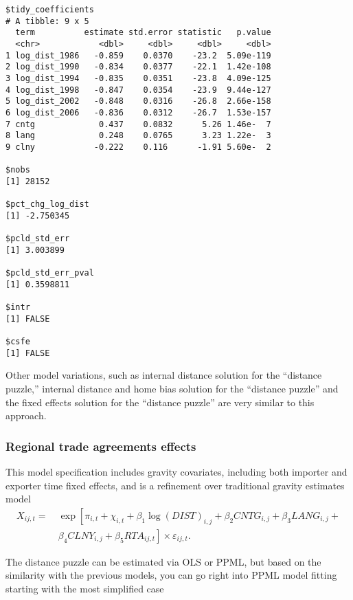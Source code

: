 \documentclass[12pt,reqno,oneside,pdftex]{formato-puc/puctesis} %
\begin{document}
\begin{verbatim}
$tidy_coefficients
# A tibble: 9 x 5
  term          estimate std.error statistic   p.value
  <chr>            <dbl>     <dbl>     <dbl>     <dbl>
1 log_dist_1986   -0.859    0.0370    -23.2  5.09e-119
2 log_dist_1990   -0.834    0.0377    -22.1  1.42e-108
3 log_dist_1994   -0.835    0.0351    -23.8  4.09e-125
4 log_dist_1998   -0.847    0.0354    -23.9  9.44e-127
5 log_dist_2002   -0.848    0.0316    -26.8  2.66e-158
6 log_dist_2006   -0.836    0.0312    -26.7  1.53e-157
7 cntg             0.437    0.0832      5.26 1.46e-  7
8 lang             0.248    0.0765      3.23 1.22e-  3
9 clny            -0.222    0.116      -1.91 5.60e-  2

$nobs
[1] 28152

$pct_chg_log_dist
[1] -2.750345

$pcld_std_err
[1] 3.003899

$pcld_std_err_pval
[1] 0.3598811

$intr
[1] FALSE

$csfe
[1] FALSE
\end{verbatim}

Other model variations, such as internal distance solution for the
``distance puzzle,'' internal distance and home bias solution for the
``distance puzzle'' and the fixed effects solution for the ``distance
puzzle'' are very similar to this approach.

\hypertarget{regional-trade-agreements-effects}{%
\subsubsection{Regional trade agreements
effects}\label{regional-trade-agreements-effects}}

This model specification includes gravity covariates, including both
importer and exporter time fixed effects, and is a refinement over
traditional gravity estimates model \begin{align*}
X_{ij,t} =& \:\exp\left[\pi_{i,t} + \chi_{i,t} + \beta_1 \log(DIST)_{i,j} + \beta_2 CNTG_{i,j} + \beta_3 LANG_{i,j} +\right.\\
\text{ }& \:\left.\beta_4 CLNY_{i,j} + \beta_5 RTA_{ij,t}\right] \times \varepsilon_{ij,t}.
\end{align*}

The distance puzzle can be estimated via OLS or PPML, but based on the
similarity with the previous models, you can go right into PPML model
fitting starting with the most simplified case
\end{document}
